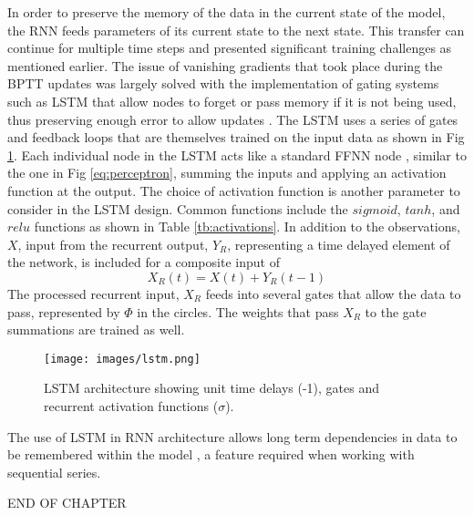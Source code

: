 In order to preserve the memory of the data in the current state of the model, the RNN feeds parameters of its current state to the next state. This transfer can continue for multiple time steps and presented significant training challenges as mentioned earlier. The issue of vanishing gradients that took place during the BPTT updates was largely solved with the implementation of gating systems such as LSTM that allow nodes to forget or pass memory if it is not being used, thus preserving enough error to allow updates \citep{Hochreiter1997}. The LSTM uses a series of gates and feedback loops that are themselves trained on the input data as shown in Fig \ref{fig:lstm}. Each individual node in the LSTM acts like a standard FFNN node , similar to the one in Fig \ref{eq:perceptron}, summing the inputs and applying an activation function at the output. The choice of activation function is another parameter to consider in the LSTM design. Common functions include the $sigmoid$, $tanh$, and $relu$ functions as shown in Table \ref{tb:activations}. In addition to the observations, $X$, input from the recurrent output, $Y_{R}$, representing a time delayed element of the network, is included for a composite input of 
%
\begin{equation}
\label{eq:Xr}
X_{R}(t) = X(t) + Y_{R}(t-1)
\end{equation}
%
The processed recurrent input, $X_{R}$ feeds into several gates that allow the data to pass, represented by $\Phi$ in the circles. The weights that pass $X_{R}$ to the gate summations are trained as well.
%
\begin{figure}[H]
\centering
\texttt{[image: images/lstm.png]} 
\caption[LSTM architecture]{LSTM architecture showing unit time delays (-1), gates and recurrent activation functions ($\sigma$).}
\label{fig:lstm}
\end{figure}
%
The use of LSTM in RNN architecture allows long term dependencies in data to be remembered within the model \citep{Graves2013a}, a feature required when working with sequential series.

\bigskip

\begin{center}
END OF CHAPTER
\end{center}
